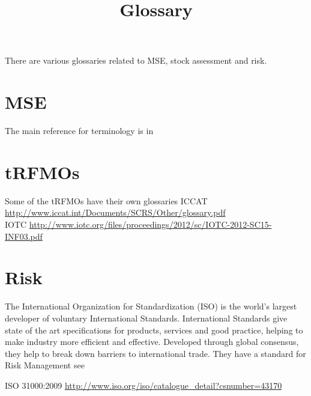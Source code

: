 \documentclass[a4paper,10pt]{article}
\title{Glossary}
\author{}
\begin{document}
\maketitle

There are various glossaries related to MSE, stock assessment and risk.
 
\section{MSE}
  The main reference for terminology is in \href{http://icesjms.oxfordjournals.org/content/64/4/618.abstract}{\cite{rademeyer2007tips}}
  
\section{tRFMOs}

Some of the tRFMOs have their own glossaries
  ICCAT \url{http://www.iccat.int/Documents/SCRS/Other/glossary.pdf}\\
  IOTC  \url{http://www.iotc.org/files/proceedings/2012/sc/IOTC-2012-SC15-INF03.pdf}\\
  
\section{Risk}

  The International Organization for Standardization (ISO) is the world’s largest developer of voluntary International Standards. 
  International Standards give state of the art specifications for products, services and good practice, helping to 
  make industry more efficient and effective. Developed through global consensus, they help to break down barriers to international trade.
  They have a standard for Risk Management see

  ISO 31000:2009 \url{http://www.iso.org/iso/catalogue_detail?csnumber=43170}




\end{document}
